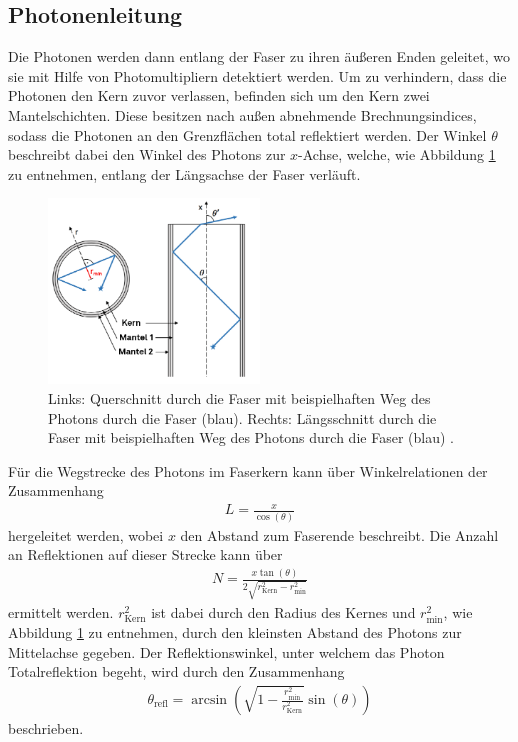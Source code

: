\subsection{Photonenleitung}
\label{theorie}
Die Photonen werden dann entlang der Faser zu ihren äußeren Enden geleitet, wo sie mit Hilfe von Photomultipliern detektiert werden. Um zu verhindern, dass die Photonen den Kern zuvor verlassen, befinden sich um den Kern zwei Mantelschichten. Diese besitzen nach außen abnehmende Brechnungsindices, sodass die Photonen an den Grenzflächen total reflektiert werden. Der Winkel $\theta$ beschreibt dabei den Winkel des Photons zur $x$-Achse, welche, wie Abbildung \ref{fig:Geometrie} zu entnehmen, entlang der Längsachse der Faser verläuft.
\begin{figure}
    \centering
    \includegraphics[width=0.5\textwidth]{plots/Geometrie.png}
    \caption{Links: Querschnitt durch die Faser mit beispielhaften Weg des Photons durch die Faser (blau). Rechts: Längsschnitt durch die Faser mit beispielhaften Weg des Photons durch die Faser (blau) \cite{anleitung}.}
    \label{fig:Geometrie}
  \end{figure}
Für die Wegstrecke des Photons im Faserkern kann über Winkelrelationen der Zusammenhang
\begin{align}
    L = \frac{x}{\cos(\theta)}
    \label{eq:1.1}
\end{align}
hergeleitet werden, wobei $x$ den Abstand zum Faserende beschreibt. Die Anzahl an Reflektionen auf dieser Strecke kann über
\begin{align}
    N = \frac{x \tan(\theta)}{2 \sqrt{r_{\mathrm{Kern}}^2 - r_{\mathrm{min}}^2}}
    \label{eq:1.2}
\end{align}
ermittelt werden. $r_{\mathrm{Kern}}^2$ ist dabei durch den Radius des Kernes und $r_{\mathrm{min}}^2$, wie Abbildung \ref{fig:Geometrie} zu entnehmen, durch den kleinsten Abstand des Photons zur Mittelachse gegeben. Der Reflektionswinkel, unter welchem das Photon Totalreflektion begeht, wird durch den Zusammenhang
\begin{align}
    \theta_{\mathrm{refl}} = \arcsin\left( \sqrt{1 - \frac{r_{\mathrm{min}}^2}{r_{\mathrm{Kern}}^2}} \sin(\theta)\right)
    \label{eq:2}
\end{align}
beschrieben.

